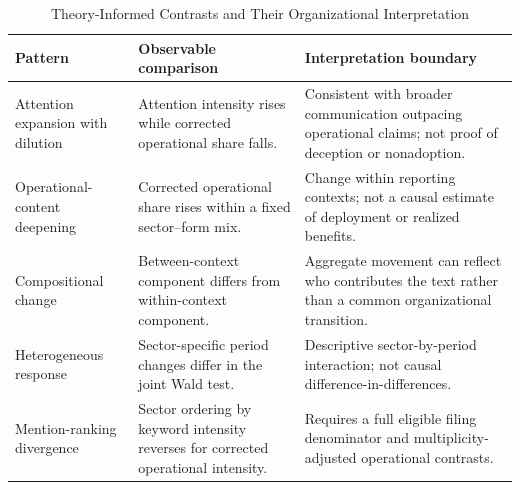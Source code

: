 \documentclass[12pt]{article}
\begin{document}
\begin{table}[htbp]
\centering
\caption{Theory-Informed Contrasts and Their Organizational Interpretation}
\label{tab:expectations}
\small
\begin{tabularx}{\textwidth}{@{}p{}p{}X@{}}
\toprule
Pattern & Observable comparison & Interpretation boundary \\
\midrule
Attention expansion with dilution & Attention intensity rises while corrected operational share falls. & Consistent with broader communication outpacing operational claims; not proof of deception or nonadoption. \\
\addlinespace
Operational-content deepening & Corrected operational share rises within a fixed sector--form mix. & Change within reporting contexts; not a causal estimate of deployment or realized benefits. \\
\addlinespace
Compositional change & Between-context component differs from within-context component. & Aggregate movement can reflect who contributes the text rather than a common organizational transition. \\
\addlinespace
Heterogeneous response & Sector-specific period changes differ in the joint Wald test. & Descriptive sector-by-period interaction; not causal difference-in-differences. \\
\addlinespace
Mention-ranking divergence & Sector ordering by keyword intensity reverses for corrected operational intensity. & Requires a full eligible filing denominator and multiplicity-adjusted operational contrasts. \\
\bottomrule
\end{tabularx}
\end{table}
\end{document}
